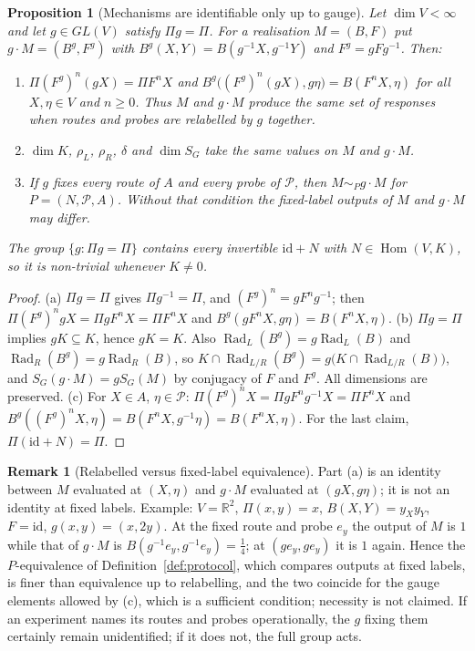 \documentclass[11pt,a4paper]{article}
\newcommand{\RR}{\mathbb{R}}
\newcommand{\Rad}{\operatorname{Rad}}
\newcommand{\id}{\mathrm{id}}
\newcommand{\defic}{\delta}
\theoremstyle{plain}
\newtheorem{proposition}[theorem]{Proposition}
\theoremstyle{definition}
\newtheorem{remark}[theorem]{Remark}
\begin{document}
\begin{proposition}[Mechanisms are identifiable only up to gauge]\label{prop:gauge}
Let $\dim V<\infty$ and let $g\in GL(V)$ satisfy $\Pi g=\Pi$. For a realisation $M=(B,F)$ put $g\cdot M=(B^g,F^g)$ with $B^g(X,Y)=B(g^{-1}X,g^{-1}Y)$ and $F^g=gFg^{-1}$. Then:
\begin{enumerate}[label=(\alph*)]
\item $\Pi(F^g)^n(gX)=\Pi F^nX$ and $B^g\bigl((F^g)^n(gX),g\eta\bigr)=B(F^nX,\eta)$ for all $X,\eta\in V$ and $n\ge0$. Thus $M$ and $g\cdot M$ produce the same set of responses \emph{when routes and probes are relabelled by $g$ together}.
\item $\dim K$, $\rho_L$, $\rho_R$, $\defic$ and $\dim S_G$ take the same values on $M$ and $g\cdot M$.
\item If $g$ fixes every route of $A$ and every probe of $\mathcal P$, then $M\sim_Pg\cdot M$ for $P=(N,\mathcal P,A)$. Without that condition the fixed-label outputs of $M$ and $g\cdot M$ may differ.
\end{enumerate}
The group $\{g:\Pi g=\Pi\}$ contains every invertible $\id+N$ with $N\in\operatorname{Hom}(V,K)$, so it is non-trivial whenever $K\ne0$.
\end{proposition}
\begin{proof}
(a) $\Pi g=\Pi$ gives $\Pi g^{-1}=\Pi$, and $(F^g)^n=gF^ng^{-1}$; then $\Pi(F^g)^ngX=\Pi gF^nX=\Pi F^nX$ and $B^g(gF^nX,g\eta)=B(F^nX,\eta)$.
(b) $\Pi g=\Pi$ implies $gK\subseteq K$, hence $gK=K$. Also $\Rad_L(B^g)=g\Rad_L(B)$ and $\Rad_R(B^g)=g\Rad_R(B)$, so $K\cap\Rad_{L/R}(B^g)=g\bigl(K\cap\Rad_{L/R}(B)\bigr)$, and $S_{G}(g\cdot M)=gS_G(M)$ by conjugacy of $F$ and $F^g$. All dimensions are preserved. (c) For $X\in A$, $\eta\in\mathcal P$: $\Pi(F^g)^nX=\Pi gF^ng^{-1}X=\Pi F^nX$ and $B^g((F^g)^nX,\eta)=B(F^nX,g^{-1}\eta)=B(F^nX,\eta)$. For the last claim, $\Pi(\id+N)=\Pi$.
\end{proof}
\begin{remark}[Relabelled versus fixed-label equivalence]\label{rem:labels}
Part (a) is an identity between $M$ evaluated at $(X,\eta)$ and $g\cdot M$ evaluated at $(gX,g\eta)$; it is not an identity at fixed labels. Example: $V=\RR^2$, $\Pi(x,y)=x$, $B(X,Y)=y_Xy_Y$, $F=\id$, $g(x,y)=(x,2y)$. At the fixed route and probe $e_y$ the output of $M$ is $1$ while that of $g\cdot M$ is $B(g^{-1}e_y,g^{-1}e_y)=\tfrac14$; at $(ge_y,ge_y)$ it is $1$ again. Hence the $P$-equivalence of Definition~\ref{def:protocol}, which compares outputs at fixed labels, is finer than equivalence up to relabelling, and the two coincide for the gauge elements allowed by (c), which is a sufficient condition; necessity is not claimed. If an experiment names its routes and probes operationally, the $g$ fixing them certainly remain unidentified; if it does not, the full group acts.
\end{remark}
\end{document}
